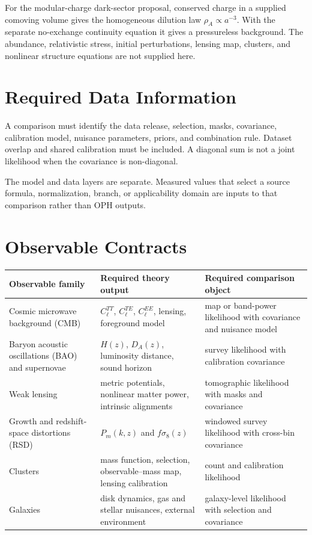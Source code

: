 \documentclass[11pt]{article}
\begin{document}
For the modular-charge dark-sector proposal, conserved charge in a supplied
comoving volume gives the homogeneous dilution law \(\rho_A\propto a^{-3}\).
With the separate no-exchange continuity equation it gives a pressureless
background. The abundance, relativistic stress,
initial perturbations, lensing map, clusters, and nonlinear structure equations
are not supplied here.

\section{Required Data Information}

A comparison must identify the data release, selection, masks, covariance,
calibration model, nuisance parameters, priors, and combination rule. Dataset
overlap and shared calibration must be included. A diagonal sum is not a joint
likelihood when the covariance is non-diagonal.

The model and data layers are separate. Measured values that select
a source formula, normalization, branch, or applicability domain are inputs to
that comparison rather than OPH outputs.

\section{Observable Contracts}

\begin{center}
\begin{tabularx}{\textwidth}{@{}l>{\raggedright\arraybackslash}X>{\raggedright\arraybackslash}X@{}}
\toprule
Observable family & Required theory output & Required comparison object \\
\midrule
Cosmic microwave background (CMB) & $C_\ell^{TT}$, $C_\ell^{TE}$, $C_\ell^{EE}$, lensing, foreground model &
map or band-power likelihood with covariance and nuisance model \\
Baryon acoustic oscillations (BAO) and supernovae & $H(z)$, $D_A(z)$, luminosity distance, sound horizon &
survey likelihood with calibration covariance \\
Weak lensing & metric potentials, nonlinear matter power, intrinsic alignments &
tomographic likelihood with masks and covariance \\
Growth and redshift-space distortions (RSD) & $P_m(k,z)$ and $f\sigma_8(z)$ &
windowed survey likelihood with cross-bin covariance \\
Clusters & mass function, selection, observable--mass map, lensing calibration &
count and calibration likelihood \\
Galaxies & disk dynamics, gas and stellar nuisances, external environment &
galaxy-level likelihood with selection and covariance \\
\bottomrule
\end{tabularx}
\end{center}
\end{document}
